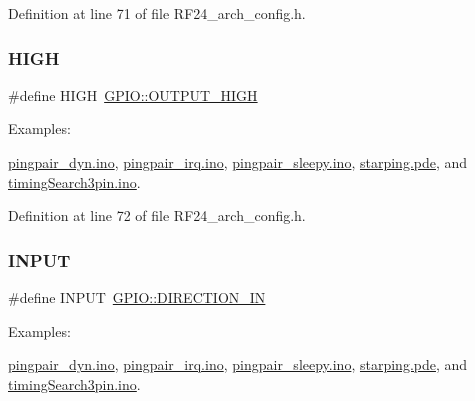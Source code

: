 Definition at line 71 of file R\+F24\+\_\+arch\+\_\+config.\+h.

\mbox{\label{group__Porting__General_ga5bb885982ff66a2e0a0a45a8ee9c35e2}} 
\subsubsection{\texorpdfstring{H\+I\+GH}{HIGH}}
{\footnotesize\ttfamily \#define H\+I\+GH~\hyperlink{group__Porting__GPIO_ga18fd76f29528fc97aadcdb78495ff6bf}{G\+P\+I\+O\+::\+O\+U\+T\+P\+U\+T\+\_\+\+H\+I\+GH}}

\begin{Desc}
\item[Examples\+: ]\par
\hyperlink{pingpair_dyn_8ino-example}{pingpair\+\_\+dyn.\+ino}, \hyperlink{pingpair_irq_8ino-example}{pingpair\+\_\+irq.\+ino}, \hyperlink{pingpair_sleepy_8ino-example}{pingpair\+\_\+sleepy.\+ino}, \hyperlink{starping_8pde-example}{starping.\+pde}, and \hyperlink{timingSearch3pin_8ino-example}{timing\+Search3pin.\+ino}.\end{Desc}


Definition at line 72 of file R\+F24\+\_\+arch\+\_\+config.\+h.

\mbox{\label{group__Porting__General_ga1bb283bd7893b9855e2f23013891fc82}} 
\subsubsection{\texorpdfstring{I\+N\+P\+UT}{INPUT}}
{\footnotesize\ttfamily \#define I\+N\+P\+UT~\hyperlink{group__Porting__GPIO_gafbf58b193d0f84db90a843e00f27367c}{G\+P\+I\+O\+::\+D\+I\+R\+E\+C\+T\+I\+O\+N\+\_\+\+IN}}

\begin{Desc}
\item[Examples\+: ]\par
\hyperlink{pingpair_dyn_8ino-example}{pingpair\+\_\+dyn.\+ino}, \hyperlink{pingpair_irq_8ino-example}{pingpair\+\_\+irq.\+ino}, \hyperlink{pingpair_sleepy_8ino-example}{pingpair\+\_\+sleepy.\+ino}, \hyperlink{starping_8pde-example}{starping.\+pde}, and \hyperlink{timingSearch3pin_8ino-example}{timing\+Search3pin.\+ino}.\end{Desc}


